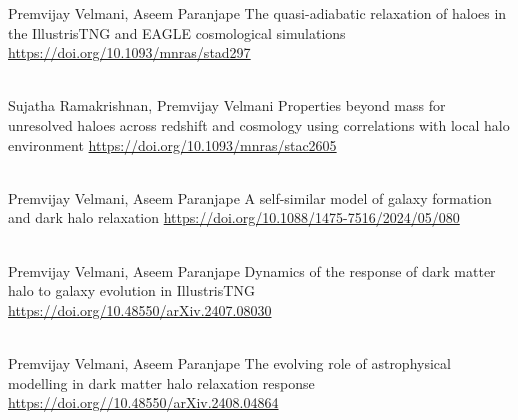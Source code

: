 \begin{cventries}

{
\cventry
{Premvijay Velmani, Aseem Paranjape}
{The quasi-adiabatic relaxation of haloes in the IllustrisTNG and EAGLE cosmological simulations}
{\url{https://doi.org/10.1093/mnras/stad297}}
{}
{
}
}

~\\[-8mm]
{
\cventry
{Sujatha Ramakrishnan, Premvijay Velmani}
{Properties beyond mass for unresolved haloes across redshift and cosmology using correlations with local halo environment}
{\url{https://doi.org/10.1093/mnras/stac2605}}
{}
{
}
}

~\\[-8mm]
{
\cventry
{Premvijay Velmani, Aseem Paranjape}
{A self-similar model of galaxy formation and dark halo relaxation}
{\url{https://doi.org/10.1088/1475-7516/2024/05/080}}
{}
{
}
}

~\\[-8mm]
{
\cventry
{Premvijay Velmani, Aseem Paranjape}
{Dynamics of the response of dark matter halo to galaxy evolution in IllustrisTNG}
{\url{https://doi.org/10.48550/arXiv.2407.08030}}
{}
{
}
}

~\\[-8mm]
{
\cventry
{Premvijay Velmani, Aseem Paranjape}
{The evolving role of astrophysical modelling in dark matter halo relaxation response}
{\url{https://doi.org//10.48550/arXiv.2408.04864}}
{}
{
}
}

\end{cventries}


{}

